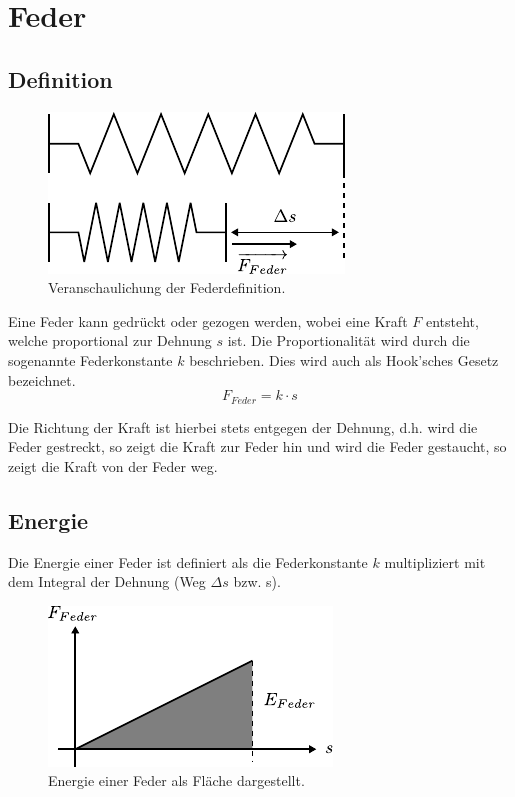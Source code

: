 \chapter{Feder}

\section{Definition}

\begin{figure}[h!]
	\centering
	\includegraphics[scale=0.75]{feder-dehnung.pdf}
	\caption{Veranschaulichung der Federdefinition.}
	\label{fig:feder-dehnung}
\end{figure}

\noindent
Eine Feder kann gedrückt oder gezogen werden, wobei eine Kraft $F$ entsteht,
welche proportional zur Dehnung $s$ ist. Die Proportionalität wird durch die
sogenannte Federkonstante $k$ beschrieben. Dies wird auch als Hook'sches
Gesetz bezeichnet.
\[ \boxed{F_{Feder} = k \cdot s} \]

\noindent
Die Richtung der Kraft ist hierbei stets entgegen der Dehnung, d.h. wird die
Feder gestreckt, so zeigt die Kraft zur Feder hin und wird die Feder
gestaucht, so zeigt die Kraft von der Feder weg.

\section{Energie}\label{sec:feder-energie}
Die Energie einer Feder ist definiert als die Federkonstante $k$ multipliziert
mit dem Integral der Dehnung (Weg $\Delta s$ bzw. s).
\begin{figure}[h!]
	\centering
	\includegraphics[scale=0.9]{feder-energie.pdf}
	\caption{Energie einer Feder als Fläche dargestellt.}
	\label{fig:feder-energie}
\end{figure}

